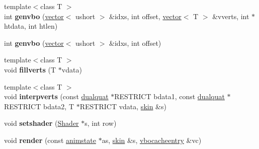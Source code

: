 \begin{DoxyCompactItemize}
\item 
\mbox{\label{structskelmodel_1_1skelmesh_af350cb411403196bee50a2c1324e36fc}} 
{\footnotesize template$<$class T $>$ }\\int {\bfseries genvbo} (\hyperlink{structvector}{vector}$<$ ushort $>$ \&idxs, int offset, \hyperlink{structvector}{vector}$<$ T $>$ \&vverts, int $\ast$htdata, int htlen)
\item 
\mbox{\label{structskelmodel_1_1skelmesh_aa0548158cbf93992b2bad3eb65eb2162}} 
int {\bfseries genvbo} (\hyperlink{structvector}{vector}$<$ ushort $>$ \&idxs, int offset)
\item 
\mbox{\label{structskelmodel_1_1skelmesh_a8dd8f69854a67778e5102be97eccaffc}} 
{\footnotesize template$<$class T $>$ }\\void {\bfseries fillverts} (T $\ast$vdata)
\item 
\mbox{\label{structskelmodel_1_1skelmesh_a0150749be66586ec1f5c1bcad6cd5662}} 
{\footnotesize template$<$class T $>$ }\\void {\bfseries interpverts} (const \hyperlink{structdualquat}{dualquat} $\ast$R\+E\+S\+T\+R\+I\+CT bdata1, const \hyperlink{structdualquat}{dualquat} $\ast$R\+E\+S\+T\+R\+I\+CT bdata2, T $\ast$R\+E\+S\+T\+R\+I\+CT vdata, \hyperlink{structanimmodel_1_1skin}{skin} \&s)
\item 
\mbox{\label{structskelmodel_1_1skelmesh_add2fae64c34321acd33515d91de79484}} 
void {\bfseries setshader} (\hyperlink{struct_shader}{Shader} $\ast$s, int row)
\item 
\mbox{\label{structskelmodel_1_1skelmesh_a9c657ab1eb4a98b585d98e560aedc946}} 
void {\bfseries render} (const \hyperlink{structanimmodel_1_1animstate}{animstate} $\ast$as, \hyperlink{structanimmodel_1_1skin}{skin} \&s, \hyperlink{structskelmodel_1_1vbocacheentry}{vbocacheentry} \&vc)
\end{DoxyCompactItemize}
